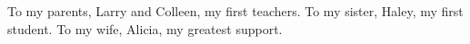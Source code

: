 To my parents, Larry and Colleen, my first teachers.
To my sister, Haley, my first student.
To my wife, Alicia, my greatest support.